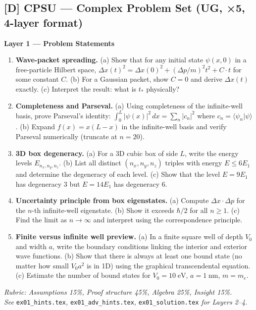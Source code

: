 \subsection*{[D] CPSU — Complex Problem Set (UG, ×5, 4-layer format)}
\begin{tcolorbox}[ugprobbox, title={CPSU · L01 · Tier 3 · 3–6 hrs total}]

\textbf{Layer 1 — Problem Statements}
\begin{enumerate}[label=\textbf{Ex\arabic*.}]
  \item \textbf{Wave-packet spreading.}
    (a) Show that for any initial state $\psi(x,0)$ in a free-particle Hilbert space,
    $\Delta x(t)^2 = \Delta x(0)^2 + (\Delta p/m)^2 t^2 + C\cdot t$ for some constant $C$.
    (b) For a Gaussian packet, show $C=0$ and derive $\Delta x(t)$ exactly.
    (c) Interpret the result: what is $t_*$ physically?

  \item \textbf{Completeness and Parseval.}
    (a) Using completeness of the infinite-well basis, prove Parseval's identity:
    $\int_0^L |\psi(x)|^2\,dx = \sum_n |c_n|^2$ where $c_n = \langle\psi_n|\psi\rangle$.
    (b) Expand $f(x) = x(L-x)$ in the infinite-well basis and verify Parseval numerically
    (truncate at $n=20$).

  \item \textbf{3D box degeneracy.}
    (a) For a 3D cubic box of side $L$, write the energy levels $E_{n_x,n_y,n_z}$.
    (b) List all distinct $(n_x,n_y,n_z)$ triples with energy $E \leq 6E_1$
    and determine the degeneracy of each level.
    (c) Show that the level $E = 9E_1$ has degeneracy 3 but $E = 14E_1$ has degeneracy 6.

  \item \textbf{Uncertainty principle from box eigenstates.}
    (a) Compute $\Delta x \cdot \Delta p$ for the $n$-th infinite-well eigenstate.
    (b) Show it exceeds $\hbar/2$ for all $n\geq1$.
    (c) Find the limit as $n\to\infty$ and interpret using the correspondence principle.

  \item \textbf{Finite versus infinite well preview.}
    (a) In a finite square well of depth $V_0$ and width $a$, write the boundary conditions
    linking the interior and exterior wave functions.
    (b) Show that there is always at least one bound state (no matter how small $V_0 a^2$
    is in 1D) using the graphical transcendental equation.
    (c) Estimate the number of bound states for $V_0 = 10\;\mathrm{eV}$, $a = 1\;\mathrm{nm}$, $m = m_e$.
\end{enumerate}
\textit{Rubric: Assumptions 15\%, Proof structure 45\%, Algebra 25\%, Insight 15\%.}\\
\textit{See} \texttt{ex01\_hints.tex}\textit{, }\texttt{ex01\_adv\_hints.tex}\textit{, }
\texttt{ex01\_solution.tex} \textit{for Layers 2–4.}
\end{tcolorbox}


